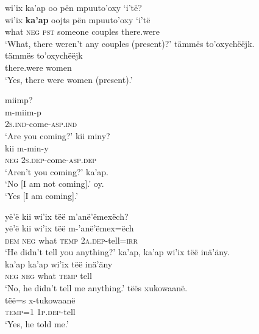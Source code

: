 \documentclass[output=paper,colorlinks,citecolor=brown,draft]{langscibook}
\begin{document}
\ea\label{ex:mix:101}
    \begin{xlist}
    \label{ex:mix:101a}
        \glll wi’ix ka’ap oo pën mpuuto’oxy ‘i’të?\\ 
              wi’ix \textbf{ka’ap} oojts pën mpuuto’oxy ‘i’të\\
              what \textsc{neg} \textsc{pst} someone couples there.were\\ 
        \glt ‘What, there weren’t any couples (present)?’
    \label{ex:mix:101b}
        \glll tämmës to’oxychëëjk. \\ 
              tämmës to’oxychëëjk  \\
              there.were women\\
        \glt ‘Yes, there were women (present).’
    \end{xlist}
\z 

\ea\label{ex:mix:102}
\begin{xlist}[B2: ]
    \label{ex:mix:102a}
        \glll miimp?\\ 
              m-miim-p\\
              \textsc{2s.ind}{}-come-\textsc{asp.ind}\\ 
        \glt ‘Are you coming?’
    \label{ex:mix:102b}
        \glll kii miny?\\ 
              kii m-min-y\\
              \textsc{neg} \textsc{2s.dep}{}-come-\textsc{asp.dep}\\ 
        \glt ‘Aren’t you coming?’
     \label{ex:mix:102c}
        \gl ka’ap.  \\
        \glt ‘No [I am not coming].’
    \label{ex:mix:102d}
        \gl oy. \\
        \glt ‘Yes [I am coming].’
    \end{xlist}
\z %

\ea\label{ex:mix:103}
    \begin{xlist}
    \label{ex:mix:103a}
        \glll yë’ë kii wi’ix tëë m’anë’ëmexëch? \\ 
              yë’ë kii wi’ix tëë m-’anë’ëmex=ëch\\
              \textsc{dem} \textsc{neg} what \textsc{temp} \textsc{2a.dep}{}-tell=\textsc{irr} \\ 
        \glt ‘He didn’t tell you anything?’
    \label{ex:mix:103b}
        \glll ka’ap, ka’ap wi’ix tëë inä’äny.\\ 
              ka’ap ka’ap wi’ix tëë inä’äny \\
              \textsc{neg} \textsc{neg} what \textsc{temp} tell\\
        \glt ‘No, he didn’t tell me anything.’
    \label{ex:mix:103c}
        \glll tëës xukowaanë.\\ 
              tëë=s x-tukowaanë \\
              \textsc{temp}=\textsc{1} \textsc{1p.dep}{}-tell\\
        \glt ‘Yes, he told me.’
    \end{xlist}
\z 
\end{document}
